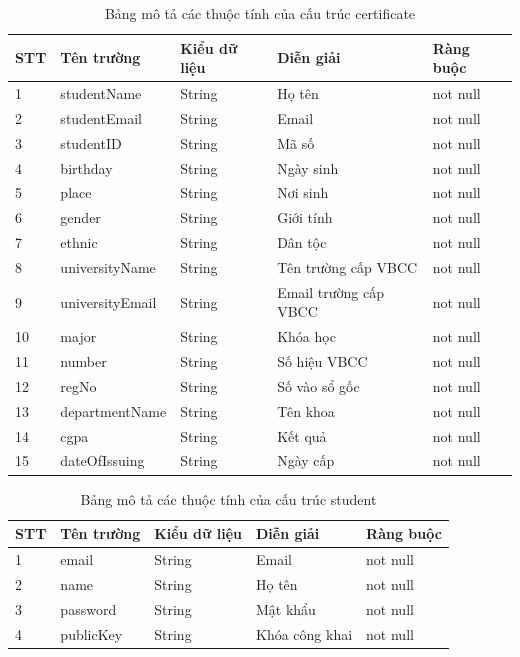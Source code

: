 \begin{table}[H]
\caption{Bảng mô tả các thuộc tính của cấu trúc certificate}
	\label{table:certificate}
	\begin{tabularx} {\textwidth} {|p{1cm}|p{3cm}|p{3cm}|X|p{2cm}|}
\hline
		STT &	Tên trường & Kiểu dữ liệu & Diễn giải & Ràng buộc \\ \hline
		1 & studentName	& String & Họ tên  & not null \\ \hline
		2 & studentEmail & String  & Email   & not null \\ \hline
		3 & studentID	&  String & Mã số  & not null\\ \hline
		4 & birthday	& String & Ngày sinh & not null\\ \hline
		5 & place	& String & Nơi sinh & not null\\ \hline
		6 & gender & String & Giới tính & not null\\ \hline
		7& ethnic	& String & Dân tộc & not null\\ \hline
		8& universityName	& String & Tên trường cấp VBCC & not null \\ \hline
		9& universityEmail	& String & Email trường cấp VBCC&not null\\ \hline
		10& major 	& String & Khóa  học  & not null\\ \hline
		11& number	& String & Số hiệu VBCC & not null\\ \hline
		12& regNo	& String & Số vào sổ gốc & not null \\ \hline
		13& departmentName	& String & Tên khoa &not null\\ \hline
		14& cgpa	& String & Kết quả & not null \\  \hline
		15& dateOfIssuing	& String & Ngày cấp &not null\\ \hline
		
\end{tabularx}
\end{table}


\begin{table}[H]
\caption{Bảng mô tả các thuộc tính của cấu trúc student}
	\label{table:student}
	\begin{tabularx} {\textwidth} {|p{1cm}|p{3cm}|p{3cm}|X|p{2cm}|}
\hline
		STT &	Tên trường & Kiểu dữ liệu & Diễn giải & Ràng buộc \\ \hline
		1 & email	& String & Email  & not null \\ \hline
		2 & name & String  & Họ tên   & not null \\ \hline
		3 & password	&  String & Mật khẩu  & not null\\ \hline
		4 & publicKey	& String & Khóa công khai  & not null\\ \hline
\end{tabularx}
\end{table}


